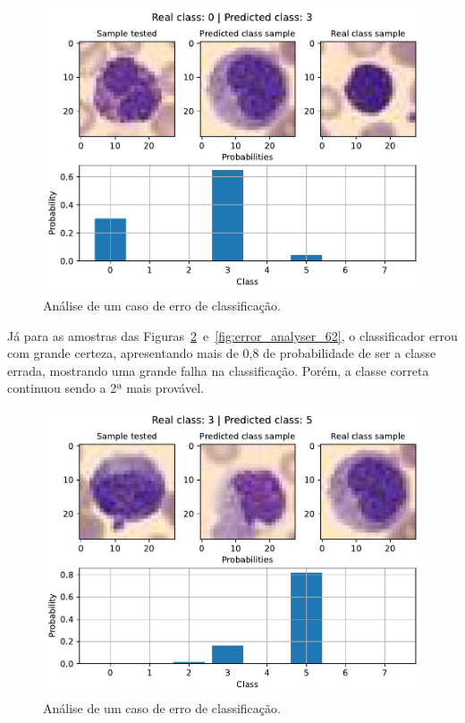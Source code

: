 \begin{figure}[H]
\centering
\includegraphics[width=0.75\linewidth]{../../plot/mlp/error_analyser_36}
\caption{Análise de um caso de erro de classificação.}
\label{fig:error_analyser_36}
\end{figure}

Já para as amostras das Figuras~\ref{fig:error_analyser_0}~e~\ref{fig:error_analyser_62}, o classificador errou com grande certeza, apresentando mais de 0,8 de probabilidade de ser a classe errada, mostrando uma grande falha na classificação. Porém, a classe correta continuou sendo a 2ª mais provável.

\begin{figure}[H]
\centering
\includegraphics[width=0.75\linewidth]{../../plot/mlp/error_analyser_0}
\caption{Análise de um caso de erro de classificação.}
\label{fig:error_analyser_0}
\end{figure}

